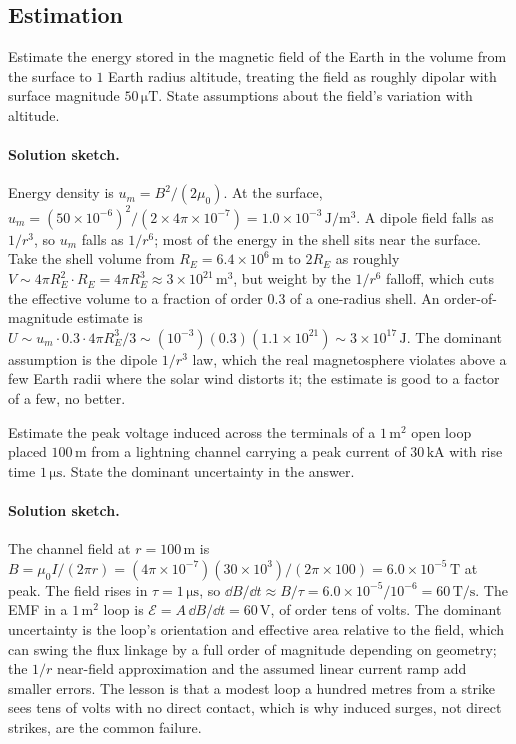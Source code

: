 \subsection*{Estimation}

\begin{exercise}
Estimate the energy stored in the magnetic field of the Earth in the
volume from the surface to $1$ Earth radius altitude, treating the
field as roughly dipolar with surface magnitude $50\,\si{\micro\tesla}$.
State assumptions about the field's variation with altitude.

\paragraph{Solution sketch.} Energy density is $u_m = B^2/(2\mu_0)$. At the
surface, $u_m = (50\times 10^{-6})^2/(2\times 4\pi\times 10^{-7}) =
1.0\times 10^{-3}\,\si{\joule\per\meter\cubed}$. A dipole field falls as
$1/r^3$, so $u_m$ falls as $1/r^6$; most of the energy in the shell sits
near the surface. Take the shell volume from $R_E = 6.4\times 10^6\,\si{
\meter}$ to $2R_E$ as roughly $V \sim 4\pi R_E^2\cdot R_E = 4\pi R_E^3
\approx 3\times 10^{21}\,\si{\meter\cubed}$, but weight by the $1/r^6$
falloff, which cuts the effective volume to a fraction of order $0.3$ of
a one-radius shell. An order-of-magnitude estimate is $U \sim u_m\cdot
0.3\cdot 4\pi R_E^3/3 \sim (10^{-3})(0.3)(1.1\times 10^{21}) \sim
3\times 10^{17}\,\si{\joule}$. The dominant assumption is the dipole
$1/r^3$ law, which the real magnetosphere violates above a few Earth
radii where the solar wind distorts it; the estimate is good to a factor
of a few, no better.
\end{exercise}

\begin{exercise}
Estimate the peak voltage induced across the terminals of a
$1\,\si{\meter\squared}$ open loop placed $100\,\si{\meter}$ from a
lightning channel carrying a peak current of $30\,\si{\kilo\ampere}$
with rise time $1\,\si{\micro\second}$. State the dominant
uncertainty in the answer.

\paragraph{Solution sketch.} The channel field at $r = 100\,\si{\meter}$
is $B = \mu_0 I/(2\pi r) = (4\pi\times 10^{-7})(30\times 10^3)/(2\pi
\times 100) = 6.0\times 10^{-5}\,\si{\tesla}$ at peak. The field rises in
$\tau = 1\,\si{\micro\second}$, so $\dd B/\dd t \approx B/\tau = 6.0
\times 10^{-5}/10^{-6} = 60\,\si{\tesla\per\second}$. The EMF in a
$1\,\si{\meter\squared}$ loop is $\mathcal{E} = A\,\dd B/\dd t = 60\,\si{
\volt}$, of order tens of volts. The dominant uncertainty is the loop's
orientation and effective area relative to the field, which can swing the
flux linkage by a full order of magnitude depending on geometry; the
$1/r$ near-field approximation and the assumed linear current ramp add
smaller errors. The lesson is that a modest loop a hundred metres from a
strike sees tens of volts with no direct contact, which is why induced
surges, not direct strikes, are the common failure.
\end{exercise}

